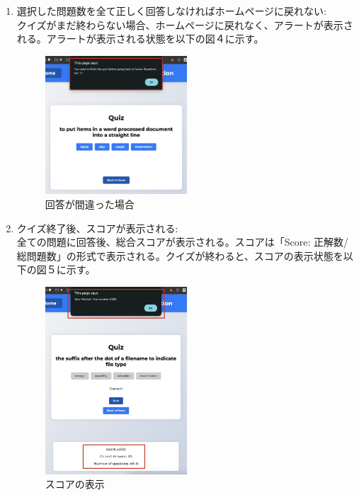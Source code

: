 \documentclass[]{jsarticle}
\begin{document}
\begin{enumerate}
    \item 選択した問題数を全て正しく回答しなければホームページに戻れない:\\
        クイズがまだ終わらない場合、ホームページに戻れなく、アラートが表示される。アラートが表示される状態を以下の図４に示す。
        
        \begin{figure}[H]
        \centering
        \includegraphics[width=0.5\textwidth]{alert-message.jpg}
        \caption{回答が間違った場合}
        \end{figure}

    \item クイズ終了後、スコアが表示される:\\
        全ての問題に回答後、総合スコアが表示される。スコアは「Score: 正解数/総問題数」の形式で表示される。クイズが終わると、スコアの表示状態を以下の図５に示す。
        
        \begin{figure}[H]
        \centering
        \includegraphics[width=0.5\textwidth]{score-display-2.jpg}
        \caption{スコアの表示}
        \end{figure}
\end{enumerate}
\end{document}
